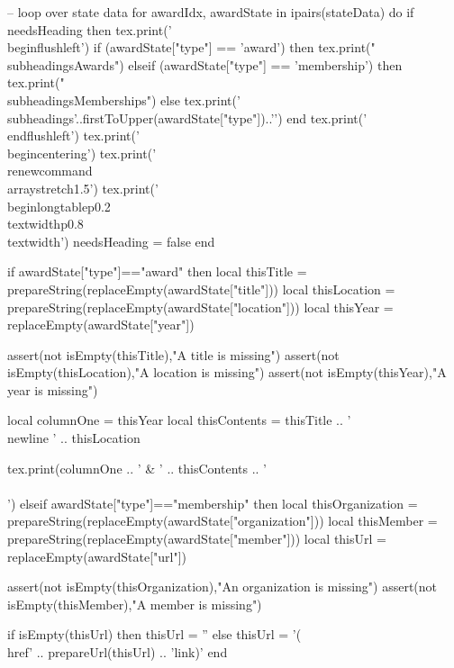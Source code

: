 \documentclass[letterpaper, 10pt]{article}
\newcommand{\subheadings}[1]{\textbf{#1} \vspace{5pt}}
\begin{document}
\begin{luacode}
			-- loop over state data
			for awardIdx, awardState in ipairs(stateData) do
				if needsHeading then
					tex.print('\\begin{flushleft}')
					if (awardState["type"] == 'award') then
						tex.print("\\subheadings{Awards}")
					elseif (awardState["type"] == 'membership') then
						tex.print("\\subheadings{Memberships}")
					else
						tex.print('\\subheadings{'..firstToUpper(awardState["type"])..'}')
					end
					tex.print('\\end{flushleft}')
					tex.print('\\begin{centering}')
					tex.print('\\renewcommand{\\arraystretch}{1.5}')
					tex.print('\\begin{longtable}{p{0.2\\textwidth}p{0.8\\textwidth}}')
					needsHeading = false
				end

				if awardState["type"]=="award" then
					local thisTitle    	= prepareString(replaceEmpty(awardState["title"]))
					local thisLocation  = prepareString(replaceEmpty(awardState["location"]))
					local thisYear   	= replaceEmpty(awardState["year"])

					assert(not isEmpty(thisTitle),"A title is missing")
					assert(not isEmpty(thisLocation),"A location is missing")
					assert(not isEmpty(thisYear),"A year is missing")

					local columnOne = thisYear
					local thisContents = thisTitle ..
										'\\newline ' .. thisLocation

					tex.print(columnOne .. ' & ' .. thisContents .. ' \\\\')
				elseif awardState["type"]=="membership" then
					local thisOrganization 	= prepareString(replaceEmpty(awardState["organization"]))
					local thisMember   		= prepareString(replaceEmpty(awardState["member"]))
					local thisUrl 			= replaceEmpty(awardState["url"])

					assert(not isEmpty(thisOrganization),"An organization is missing")
					assert(not isEmpty(thisMember),"A member is missing")

					if isEmpty(thisUrl) then
						thisUrl = ''
					else
						thisUrl = '(\\href{' .. prepareUrl(thisUrl) .. '}{link})'
					end


\end{luacode}
\end{document}
